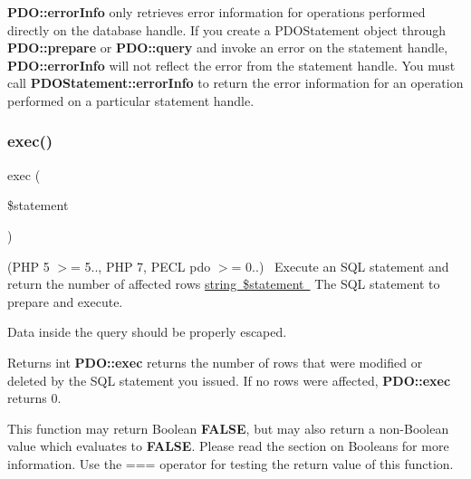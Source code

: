 {\bfseries P\+D\+O\+::error\+Info} only retrieves error information for operations performed directly on the database handle. If you create a P\+D\+O\+Statement object through {\bfseries P\+D\+O\+::prepare} or {\bfseries P\+D\+O\+::query} and invoke an error on the statement handle, {\bfseries P\+D\+O\+::error\+Info} will not reflect the error from the statement handle. You must call {\bfseries P\+D\+O\+Statement\+::error\+Info} to return the error information for an operation performed on a particular statement handle. \mbox{\label{interface_pes_1_1_database_1_1_handler_1_1_p_d_o_interface_aa14a8f8ef2c7ed2b8985d28b336941c9}} 
\subsubsection{\texorpdfstring{exec()}{exec()}}
{\footnotesize\ttfamily exec (\begin{DoxyParamCaption}\item[{}]{\$statement }\end{DoxyParamCaption})}

(P\+HP 5 $>$= 5.., P\+HP 7, P\+E\+CL pdo $>$= 0..)~\newline
 Execute an S\+QL statement and return the number of affected rows \mbox{\hyperlink{}{string \$statement }} The S\+QL statement to prepare and execute. 

Data inside the query should be properly escaped. 

\begin{DoxyReturn}{Returns}
int {\bfseries P\+D\+O\+::exec} returns the number of rows that were modified or deleted by the S\+QL statement you issued. If no rows were affected, {\bfseries P\+D\+O\+::exec} returns 0. 
\end{DoxyReturn}
This function may return Boolean {\bfseries F\+A\+L\+SE}, but may also return a non-\/\+Boolean value which evaluates to {\bfseries F\+A\+L\+SE}. Please read the section on Booleans for more information. Use the === operator for testing the return value of this function. 

